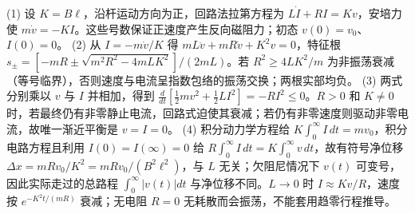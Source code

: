 (1) 设 \(K=B\ell\)，沿杆运动方向为正，回路法拉第方程为 \(L\dot I+RI=Kv\)，安培力使 \(m\dot v=-KI\)。这些号数保证正速度产生反向磁阻力；初态 \(v(0)=v_0\)、\(I(0)=0\)。
(2) 从 \(I=-m\dot v/K\) 得 \(mL\ddot v+mR\dot v+K^2v=0\)，特征根 \(s_\pm=[-mR\pm\sqrt{m^2R^2-4mLK^2}]/(2mL)\)。若 \(R^2\ge4LK^2/m\) 为非振荡衰减（等号临界），否则速度与电流呈指数包络的振荡交换；两根实部均负。
(3) 两式分别乘以 \(v\) 与 \(I\) 并相加，得到 \(\frac d{dt}[\frac12mv^2+\frac12LI^2]=-RI^2\le0\)。\(R>0\) 和 \(K\ne0\) 时，若最终仍有非零静止电流，回路式迫使其衰减；若仍有非零速度则驱动非零电流，故唯一渐近平衡是 \(v=I=0\)。
(4) 积分动力学方程给 \(K\int_0^\infty I\,dt=mv_0\)，积分电路方程且利用 \(I(0)=I(\infty)=0\) 给 \(R\int_0^\infty I\,dt=K\int_0^\infty v\,dt\)，故有符号净位移 \(\Delta x=mRv_0/K^2=mRv_0/(B^2\ell^2)\)，与 \(L\) 无关；欠阻尼情况下 \(v(t)\) 可变号，因此实际走过的总路程 \(\int_0^\infty|v(t)|dt\) 与净位移不同。\(L\to0\) 时 \(I\approx Kv/R\)，速度按 \(e^{-K^2t/(mR)}\) 衰减；无电阻 \(R=0\) 无耗散而会振荡，不能套用趋零行程推导。
